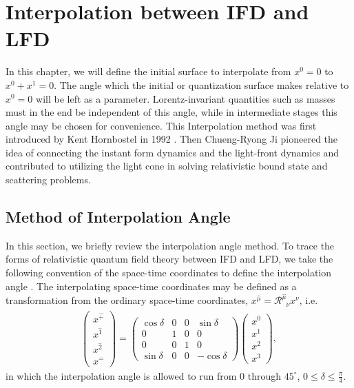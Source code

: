 \documentclass[12pt,a4paper]{report}
\newcommand{\muT}{\hat{\mu}}
\begin{document}
  
  \noindent{\rule{\textwidth}{1.5pt}}
  
  
\chapter{Interpolation between IFD and LFD}      
In this chapter, we will define the initial surface to interpolate from $x^0=0$ to $x^0+x^1=0$. The angle which the initial or quantization surface makes relative to $x^0=0$ will be left as a parameter. Lorentz-invariant quantities such as masses must in the end be independent of this angle, while in intermediate stages this angle may be chosen for convenience. This Interpolation method was first introduced by Kent Hornbostel in 1992 \cite{Hornbostel}. Then Chueng-Ryong Ji \cite{poin, gauge, crji1, crji2, crji3, crji4} pioneered the idea of connecting the instant form dynamics and the light-front dynamics and contributed to utilizing the light cone in solving relativistic bound state and scattering problems.
\section{Method of Interpolation Angle}
In this section, we briefly review the interpolation angle method.
To trace the forms of relativistic quantum field theory between	IFD and LFD, we take the following convention of the space-time coordinates to define the interpolation angle \cite{Hornbostel, poin, gauge, crji1, crji2, crji3, crji4}. The interpolating space-time coordinates may be defined as a transformation from the ordinary space-time coordinates, $x^{\muT}=\mathcal{R}^{\muT}_{\phantom{\mu}{\nu}}x^{\nu}$, i.e.
\begin{align}\label{eqn:interpolation_angle_definition}
  \begin{pmatrix}
    x^{\hat{+}}\\
    x^{\hat{1}}\\
    x^{\hat{2}}\\
    x^{\hat{-}}
  \end{pmatrix}=
  \begin{pmatrix}
    \cos\delta & 0  & 0  & \sin\delta \\
    0          & 1  & 0  & 0 \\
    0          & 0  & 1  & 0 \\
    \sin\delta & 0  & 0  & -\cos\delta
  \end{pmatrix}
  \begin{pmatrix}
    x^{0}\\
    x^{1}\\
    x^{2}\\
    x^{3}
  \end{pmatrix},
\end{align}
	in which the interpolation angle is allowed to run from 0 through
	$45^\circ$, $0\le \delta \le \frac{\pi}{4}$.
	
\end{document}
